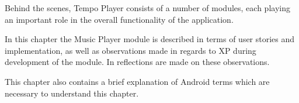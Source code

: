 Behind the scenes, Tempo Player consists of a number of modules, each playing an important role in the overall functionality of the application. 

In this chapter the Music Player module is described in terms of user stories and implementation, as well as observations made in regards to XP during development of the module. In  reflections are made on these observations.

This chapter also contains a brief explanation of Android terms which are necessary to understand this chapter.
